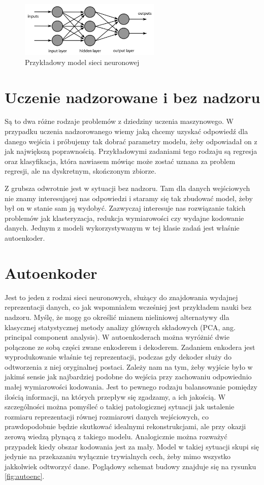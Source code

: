 \begin{figure}[h!]
    \centering
    \includegraphics[width=0.6\textwidth]{images/neural_nets}
    \caption{Przykładowy model sieci neuronowej}
    \label{fig:neural_nets}
\end{figure}

\section{Uczenie nadzorowane i bez nadzoru}

Są to dwa różne rodzaje problemów z dziedziny uczenia maszynowego. W przypadku uczenia nadzorowanego wiemy jaką chcemy uzyskać odpowiedź dla danego wejścia i próbujemy tak dobrać parametry modelu, żeby odpowiadał on z jak największą poprawnością. Przykładowymi zadaniami tego rodzaju są regresja oraz klasyfikacja, która nawiasem mówiąc może zostać uznana za problem regresji, ale na dyskretnym, skończonym zbiorze.

Z grubsza odwrotnie jest w sytuacji bez nadzoru. Tam dla danych wejściowych nie znamy interesującej nas odpowiedzi i staramy się tak zbudować model, żeby był on w stanie sam ją wydobyć. Zazwyczaj interesuje nas rozwiązanie takich problemów jak klasteryzacja, redukcja wymiarowości czy wydajne kodowanie danych. Jednym z modeli wykorzystywanym w tej klasie zadań jest właśnie autoenkoder.

\section{Autoenkoder}

Jest to jeden z rodzai sieci neuronowych, służący do znajdowania wydajnej reprezentacji danych, co jak wspomniałem wcześniej jest przykładem nauki bez nadzoru. Myślę, że mogę go określić mianem nieliniowej alternatywy dla klasycznej statystycznej metody analizy głównych składowych (PCA, ang. principal component analysis). W autoenkoderach można wyróżnić dwie połączone ze sobą części zwane enkoderem i dekoderem. Zadaniem enkodera jest wyprodukowanie właśnie tej reprezentacji, podczas gdy dekoder służy do odtworzenia z niej oryginalnej postaci. Zależy nam na tym, żeby wyjście było w jakimś sensie jak najbardziej podobne do wejścia przy zachowaniu odpowiednio małej wymiarowości kodowania. Jest to pewnego rodzaju balansowanie pomiędzy ilością informacji, na których przepływ się zgadzamy, a ich jakością. W szczególności można pomyśleć o takiej patologicznej sytuacji jak ustalenie rozmiaru reprezentacji równej rozmiarowi danych wejściowych, co prawdopodobnie będzie skutkować idealnymi rekonstrukcjami, ale przy okazji zerową wiedzą płynącą z takiego modelu. Analogicznie można rozważyć przypadek kiedy obszar kodowania jest za mały. Model w takiej sytuacji skupi się jedynie na przekazaniu wyłącznie trywialnych cech, żeby mimo wszystko jakkolwiek odtworzyć dane. Poglądowy schemat budowy znajduje się na rysunku \ref{fig:autoenc}.

